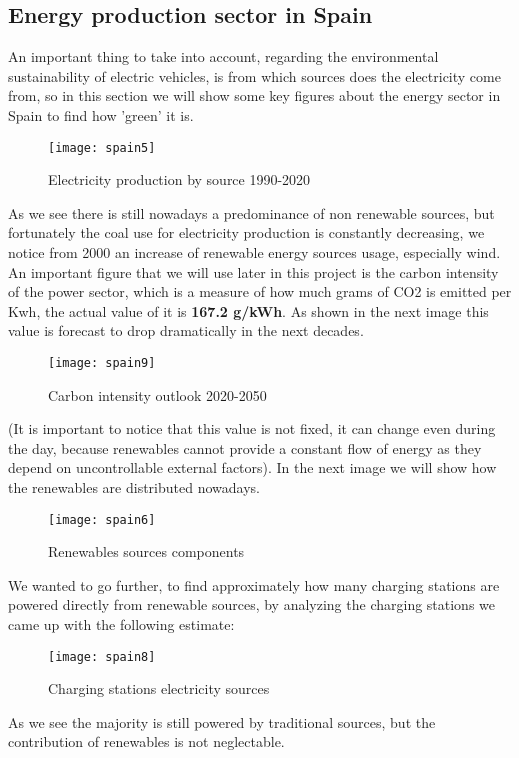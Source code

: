 \documentclass{article}
\begin{document}
\subsection{Energy production sector in Spain}
An important thing to take into account, regarding the environmental sustainability of electric vehicles, is  from which sources does the electricity come from, so in this section we will show some key figures about the energy sector in Spain to find how 'green' it is.
\begin{figure}[H]
\centering
\texttt{[image: spain5]}
\caption{Electricity production by source 1990-2020  \cite{iea}}
\end{figure}
As we see there is still nowadays a predominance of non renewable sources, but fortunately the coal use for electricity production is constantly decreasing, we notice from 2000 an increase of renewable energy sources usage, especially wind.
An important figure that we will use later in this project is the carbon intensity of the power sector, which is a measure of how much grams of CO2 is emitted per Kwh, the actual value of it is \textbf{167.2 g/kWh}. \cite{statista}
As shown in the next image this value is forecast to drop dramatically in the next decades.\\

\begin{figure}[H]
{\centering
\texttt{[image: spain9]}
\caption{Carbon intensity outlook 2020-2050  \cite{statista}}}
\end{figure}
(It is important to notice that this value is not fixed, it can change even during the day, because renewables cannot provide a constant flow of energy as they depend on uncontrollable external factors). 
\newpage
In the next image we will show how the renewables are distributed nowadays.\\

\begin{figure}[H]
\centering
\texttt{[image: spain6]}
\caption{Renewables sources components \cite{renewables}}
\end{figure}
We wanted to go further, to find approximately how many charging stations are powered directly from renewable sources, by analyzing the charging stations we came up with the following estimate:\\

\begin{figure}[H]
\centering
\texttt{[image: spain8]}
\caption{Charging stations electricity sources  \cite{electromaps}}
\end{figure}
As we see the majority is still powered by traditional sources, but the contribution of renewables is not neglectable.
\end{document}
